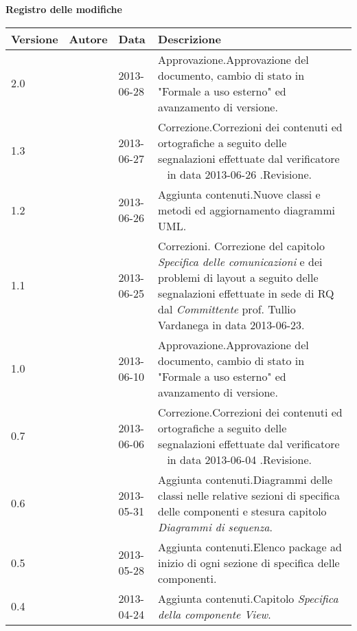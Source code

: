 \Large{\textbf{Registro delle modifiche}}\\
\normalsize

\label{tabVers}
	\begin{longtable}{p{} p{} p{} p{}} 
\toprule
\textbf{Versione}	&	\textbf{Autore}	&	\textbf{Data}	&	\textbf{Descrizione}\\
\midrule
\midrule
2.0	&	\VP &	2013-06-28	&	Approvazione.\newline Approvazione del documento, cambio di stato in "Formale a uso esterno" ed avanzamento di versione.\\
\midrule
1.3	&	\MB &	2013-06-27	&	Correzione.\newline Correzioni dei contenuti ed ortografiche a seguito delle segnalazioni effettuate dal verificatore \SL~ in data 2013-06-26 .\newline Revisione.\\
\midrule
1.2	&	\MB &	2013-06-26	&	Aggiunta contenuti.\newline Nuove classi e metodi ed aggiornamento diagrammi UML\g .\\
\midrule
1.1	&	\VP &	2013-06-25	&	Correzioni. \newline Correzione del capitolo \emph{Specifica delle comunicazioni} e dei problemi di layout a seguito delle segnalazioni effettuate in sede di RQ dal \emph{Committente} prof. Tullio Vardanega in data 2013-06-23.\\
\midrule
1.0	&	\VP &	2013-06-10	&	Approvazione.\newline Approvazione del documento, cambio di stato in "Formale a uso esterno" ed avanzamento di versione.\\
\midrule
0.7	&	\MB &	2013-06-06	&	Correzione.\newline Correzioni dei contenuti ed ortografiche a seguito delle segnalazioni effettuate dal verificatore \EZ~ in data 2013-06-04 .\newline Revisione.\\
\midrule
0.6	&	\EZ &	2013-05-31	&	Aggiunta contenuti.\newline Diagrammi delle classi nelle relative sezioni di specifica delle componenti e stesura capitolo \textit{Diagrammi di sequenza}.\\
\midrule
0.5	&	\MB &	2013-05-28	&	Aggiunta contenuti.\newline Elenco package ad inizio di ogni sezione di specifica delle componenti.\\
\midrule
0.4	&	\MB &	2013-04-24	&	Aggiunta contenuti.\newline Capitolo \textit{Specifica della componente View}.\\

\end{longtable}

